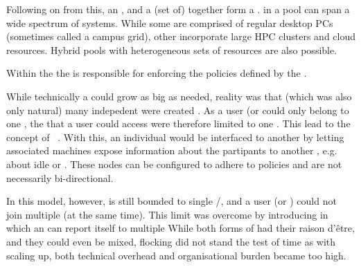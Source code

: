 \documentclass{sig-alternate}
\begin{document}
Following on from this, an ,  and a (set of)
 together form a . 
 in a pool can span a wide spectrum of systems.
While some  are comprised of regular desktop PCs (sometimes
called a campus grid), other  incorporate large HPC clusters and
cloud resources.  Hybrid pools with heterogeneous sets of resources are also
possible.

Within the  the  is responsible for enforcing
the policies defined by the .


%
%
While technically a  could grow as big as needed, reality was
that (which was also only natural) many indepedent  were created
.
As a user (or  could only belong to one ,
the  that a user could access were therefore limited to one
.
This lead to the concept of ~\cite{Epema:1996:flocking}.
With this, an individual  would be interfaced to another
 by letting associated  machines expose
information about the  partipants to another ,
e.g. about idle  or .
These  nodes can be configured to adhere to policies and are
not necessarily bi-directional.

In this model, however,  is still bounded to single
/, and a user (or )
could not join multiple (at the same time).
%
%
This limit was overcome by introducing  in which an
 can report itself to multiple  
While both forms of  had their raison d'\^{e}tre, and they
could even be mixed,  flocking did not stand the test of time
as with scaling up, both technical overhead and organisational burden became
too high.
\end{document}
